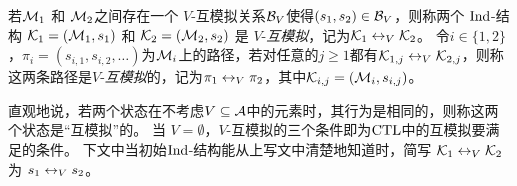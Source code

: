 若${\cal M}_1$ 和 ${\cal M}_2$之间存在一个 $V$-互模拟关系${\cal B}_V$使得$(s_1, s_2)\in {\cal B}_V$，则称两个 $\textrm{Ind}$-结构 ${\cal K}_1 = ({\cal M}_1, s_1)$ 和 ${\cal K}_2 = ({\cal M}_2, s_2)$ 是 $V$-{\em 互模拟}，记为${\cal K}_1 \leftrightarrow_V {\cal K}_2$。
令$i\in \{1,2\}$，$\pi_i=(s_{i,1},s_{i,2},\ldots)$为${\cal M}_i$上的路径，若对任意的$j \ge 1$都有$ {\cal K}_{1,j} \leftrightarrow_V {\cal K}_{2,j}$，则称这两条路径是$V$-{\em 互模拟}的，记为$\pi_1 \leftrightarrow_V \pi_2$，其中${\cal K}_{i,j}=({\cal M}_i,s_{i,j})$。


直观地说，若两个状态在不考虑$V\subseteq\cal A$中的元素时，其行为是相同的，则称这两个状态是“互模拟”的。
当 $V=\emptyset$，$V$-互模拟的三个条件即为$\textrm{CTL}$中的互模拟要满足的条件。
下文中当初始$\textrm{Ind}$-结构能从上写文中清楚地知道时，简写 ${\cal K}_1 \leftrightarrow_V {\cal K}_2$ 为 $s_1 \leftrightarrow_V s_2$。

%
